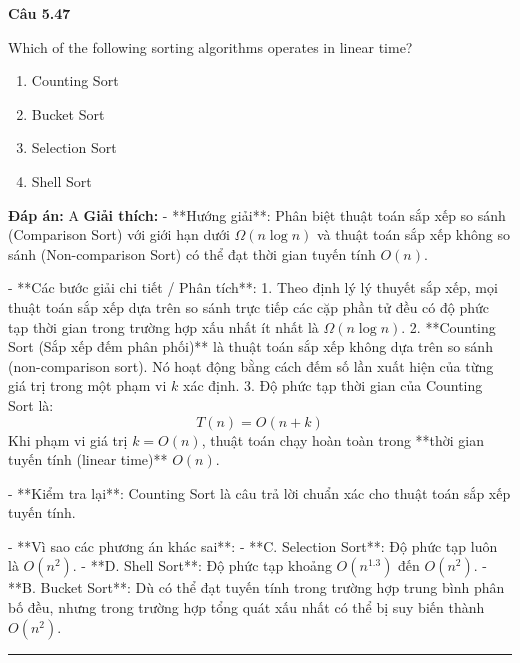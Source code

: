 \documentclass[11pt,a4paper]{article}
\newenvironment{question}[1]{%
  \par\vspace{1em}\noindent\textbf{\large Câu #1}\par\vspace{0.4em}
}{%
  \par\vspace{1em}\hrule\vspace{0.6em}
}
\newenvironment{choices}{%
  \begin{enumerate}[label=\textbf{\Alph*.},leftmargin=2.2em,itemsep=2pt,topsep=3pt]
}{%
  \end{enumerate}
}
\newcommand{\choice}{\item}
\begin{document}
\begin{question}{5.47}
Which of the following sorting algorithms operates in linear time?
\begin{choices}
\choice Counting Sort
\choice Bucket Sort
\choice Selection Sort
\choice Shell Sort
\end{choices}
\textbf{Đáp án:} A
\textbf{Giải thích:} - **Hướng giải**:
  Phân biệt thuật toán sắp xếp so sánh (Comparison Sort) với giới hạn dưới \(\Omega(n \log n)\) và thuật toán sắp xếp không so sánh (Non-comparison Sort) có thể đạt thời gian tuyến tính \(O(n)\).

- **Các bước giải chi tiết / Phân tích**:
  1. Theo định lý lý thuyết sắp xếp, mọi thuật toán sắp xếp dựa trên so sánh trực tiếp các cặp phần tử đều có độ phức tạp thời gian trong trường hợp xấu nhất ít nhất là \(\Omega(n \log n)\).
  2. **Counting Sort (Sắp xếp đếm phân phối)** là thuật toán sắp xếp không dựa trên so sánh (non-comparison sort). Nó hoạt động bằng cách đếm số lần xuất hiện của từng giá trị trong một phạm vi \(k\) xác định.
  3. Độ phức tạp thời gian của Counting Sort là:
     \[
     T(n) = O(n + k)
     \]
     Khi phạm vi giá trị \(k = O(n)\), thuật toán chạy hoàn toàn trong **thời gian tuyến tính (linear time)** \(O(n)\).

- **Kiểm tra lại**:
  Counting Sort là câu trả lời chuẩn xác cho thuật toán sắp xếp tuyến tính.

- **Vì sao các phương án khác sai**:
  - **C. Selection Sort**: Độ phức tạp luôn là \(O(n^2)\).
  - **D. Shell Sort**: Độ phức tạp khoảng \(O(n^{1.3})\) đến \(O(n^2)\).
  - **B. Bucket Sort**: Dù có thể đạt tuyến tính trong trường hợp trung bình phân bố đều, nhưng trong trường hợp tổng quát xấu nhất có thể bị suy biến thành \(O(n^2)\).
\end{question}
\end{document}
